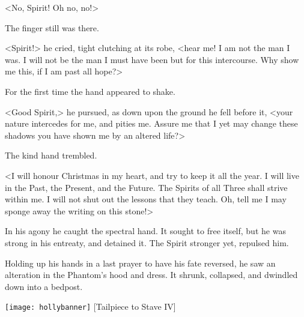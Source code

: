 <No, Spirit! Oh no, no!>

The finger still was there.

<Spirit!> he cried, tight clutching at its robe, <hear me! I am not the man I was. I will not be the man I must have been but for this intercourse. Why show me this, if I am past all hope?>

For the first time the hand appeared to shake.

<Good Spirit,> he pursued, as down upon the ground he fell before it, <your nature intercedes for me, and pities me. Assure me that I yet may change these shadows you have shown me by an altered life?>

The kind hand trembled.

<I will honour Christmas in my heart, and try to keep it all the year. I will live in the Past, the Present, and the Future. The Spirits of all Three shall strive within me. I will not shut out the lessons that they teach. Oh, tell me I may sponge away the writing on this stone!>

In his agony he caught the spectral hand. It sought to free itself, but he was strong in his entreaty, and detained it. The Spirit stronger yet, repulsed him.

Holding up his hands in a last prayer to have his fate reversed, he saw an alteration in the Phantom's hood and dress. It shrunk, collapsed, and dwindled down into a bedpost.


\vfill
\begin{center}
\texttt{[image: hollybanner]}
[Tailpiece to Stave IV]{}
\end{center}

